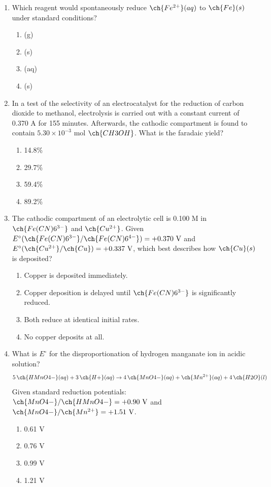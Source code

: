 \documentclass[twocolumn,10pt]{article}
\begin{document}
\begin{enumerate}[label=\arabic*., leftmargin=*]
\item Which reagent would spontaneously reduce $\ch{Fe^{2+}}(aq)$ to $\ch{Fe}(s)$ under standard conditions?
\begin{enumerate}[label=(\Alph*)]
    \item {}(g) \item {}(s) \item {}(aq) \item {}(s)
\end{enumerate}

\item In a test of the selectivity of an electrocatalyst for the reduction of carbon dioxide to methanol, electrolysis is carried out with a constant current of 0.370 A for 155 minutes. Afterwards, the cathodic compartment is found to contain $5.30 \times 10^{-3}$ mol $\ch{CH3OH}$. What is the faradaic yield?
\begin{enumerate}[label=(\Alph*)]
    \item 14.8\% \item 29.7\% \item 59.4\% \item 89.2\%
\end{enumerate}

\item The cathodic compartment of an electrolytic cell is 0.100 M in $\ch{Fe(CN)6^{3-}}$ and $\ch{Cu^{2+}}$. Given $E^\circ(\ch{Fe(CN)6^{3-}}/\ch{Fe(CN)6^{4-}}) = +0.370\text{ V}$ and $E^\circ(\ch{Cu^{2+}}/\ch{Cu}) = +0.337\text{ V}$, which best describes how $\ch{Cu}(s)$ is deposited?
\begin{enumerate}[label=(\Alph*)]
    \item Copper is deposited immediately.
    \item Copper deposition is delayed until $\ch{Fe(CN)6^{3-}}$ is significantly reduced.
    \item Both reduce at identical initial rates.
    \item No copper deposits at all.
\end{enumerate}

\item What is $E^\circ$ for the disproportionation of hydrogen manganate ion in acidic solution?
\[ 5\,\ch{HMnO4-}(aq) + 3\,\ch{H+}(aq) \rightarrow 4\,\ch{MnO4-}(aq) + \ch{Mn^{2+}}(aq) + 4\,\ch{H2O}(l) \]
Given standard reduction potentials: $\ch{MnO4-}/\ch{HMnO4-} = +0.90\text{ V}$ and $\ch{MnO4-}/\ch{Mn^{2+}} = +1.51\text{ V}$.
\begin{enumerate}[label=(\Alph*)]
    \item 0.61 V \item 0.76 V \item 0.99 V \item 1.21 V
\end{enumerate}


\end{enumerate}
\end{document}
